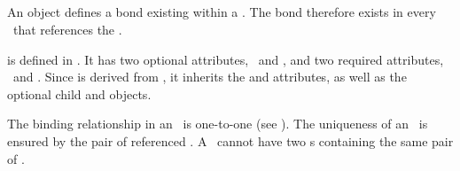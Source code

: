 \subsection{}
\label{def:InSpeciesTypeBond}

An  object defines a bond existing within a \speciesType. The bond therefore exists in every \species\ that references the \speciesType. 

 is defined in . It has two optional attributes, \idAtt\ and \nameAtt, and two required attributes, \bindingSiteOneAtt\ and \bindingSiteTwoAtt. Since  is derived from , it inherits the  and  attributes, as well as the optional \mBlockChangedBegin{\revTwentyTwentyMarch}child\mBlockChangedEnd{\revTwentyTwentyMarch}  and  objects. 

\label{def:InSpeciesTypeBondNote}
The binding relationship in an \inSpeciesTypeBond\ is one-to-one (see ). The uniqueness of an \inSpeciesTypeBond\ is ensured by the pair of referenced . A \speciesType\ cannot have two \inSpeciesTypeBond s containing the same pair of . 

